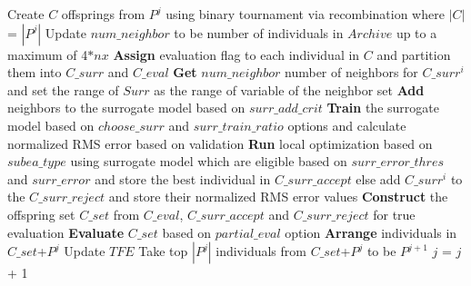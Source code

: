 \begin{algorithm}[!ht]
\begin{algorithmic}[1]
		\STATE Create $C$ offsprings from $P^j$ using binary tournament via recombination where $\left|C\right|$ = $\left|P^j\right|$
		\STATE Update $num\_neighbor$ to be number of individuals in $Archive$ up to a maximum of 4$*nx$
		\STATE \textbf{Assign} evaluation flag to each individual in $C$ and partition them into $C\_surr$ and $C\_eval$
		\STATE \textbf{Get} $num\_neighbor$ number of neighbors for $C\_surr^i$ and set the range of $Surr$ as the range of variable of the neighbor set
		\STATE \textbf{Add} neighbors to the surrogate model based on $surr\_add\_crit$
		\STATE \textbf{Train} the surrogate model based on $choose\_surr$ and $surr\_train\_ratio$ options and calculate normalized RMS error based on validation
		\STATE \textbf{Run} local optimization based on $subea\_type$ using surrogate model which are eligible based on $surr\_error\_thres$ and $surr\_error$ and store the best individual in $C\_surr\_accept$ else add $C\_surr^i$ to the $C\_surr\_reject$ and store their normalized RMS error values
		\ENDFOR		
		\STATE \textbf{Construct} the offspring set $C\_set$ from $C\_eval$, $C\_surr\_accept$ and $C\_surr\_reject$ for true evaluation
		\STATE \textbf{Evaluate} $C\_set$ based on $partial\_eval$ option
		\STATE \textbf{Arrange} individuals in $C\_set$+$P^j$
		\STATE Update $TFE$
		\STATE Take top $\left|P^j\right|$ individuals from $C\_set$+$P^j$ to be $P^{j+1}$
		\STATE $j$ = $j$ + 1
		\ENDWHILE			
		
	\end{algorithmic}
	\label{alg:SAEA}
\end{algorithm}

